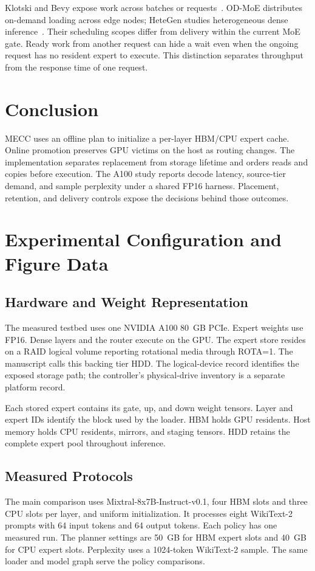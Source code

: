 \documentclass[conference,9pt,letterpaper]{IEEEtran}
\begin{document}
Klotski and Bevy expose work across batches or requests~\cite{klotski,bevy}. OD-MoE distributes on-demand loading across edge nodes; HeteGen studies heterogeneous dense inference~\cite{odmoe,hetegen}. Their scheduling scopes differ from delivery within the current MoE gate. Ready work from another request can hide a wait even when the ongoing request has no resident expert to execute. This distinction separates throughput from the response time of one request.

\section{Conclusion}
MECC uses an offline plan to initialize a per-layer HBM/CPU expert cache. Online promotion preserves GPU victims on the host as routing changes. The implementation separates replacement from storage lifetime and orders reads and copies before execution. The A100 study reports decode latency, source-tier demand, and sample perplexity under a shared FP16 harness. Placement, retention, and delivery controls expose the decisions behind those outcomes.

\clearpage
\nobalance
{}


\clearpage
\appendices
\balance
\section{Experimental Configuration and Figure Data}
\label{app:setup}
\subsection{Hardware and Weight Representation}
The measured testbed uses one NVIDIA A100 80~GB PCIe. Expert weights use FP16. Dense layers and the router execute on the GPU. The expert store resides on a RAID logical volume reporting rotational media through ROTA=1. The manuscript calls this backing tier HDD. The logical-device record identifies the exposed storage path; the controller's physical-drive inventory is a separate platform record.

Each stored expert contains its gate, up, and down weight tensors. Layer and expert IDs identify the block used by the loader. HBM holds GPU residents. Host memory holds CPU residents, mirrors, and staging tensors. HDD retains the complete expert pool throughout inference.

\subsection{Measured Protocols}
The main comparison uses Mixtral-8x7B-Instruct-v0.1, four HBM slots and three CPU slots per layer, and uniform initialization. It processes eight WikiText-2 prompts with 64 input tokens and 64 output tokens. Each policy has one measured run. The planner settings are 50~GB for HBM expert slots and 40~GB for CPU expert slots. Perplexity uses a 1024-token WikiText-2 sample. The same loader and model graph serve the policy comparisons.
\end{document}
